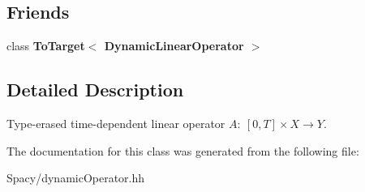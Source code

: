 \subsection*{Friends}
\begin{DoxyCompactItemize}
\item 
\hypertarget{classSpacy_1_1DynamicLinearOperator_abf468765fdbe6d2be4c7038a469b3802}{}class {\bfseries To\+Target$<$ Dynamic\+Linear\+Operator $>$}\label{classSpacy_1_1DynamicLinearOperator_abf468765fdbe6d2be4c7038a469b3802}

\end{DoxyCompactItemize}


\subsection{Detailed Description}
Type-\/erased time-\/dependent linear operator $A:\ [0,T] \times X \to Y $. 

The documentation for this class was generated from the following file\+:\begin{DoxyCompactItemize}
\item 
Spacy/dynamic\+Operator.\+hh\end{DoxyCompactItemize}
